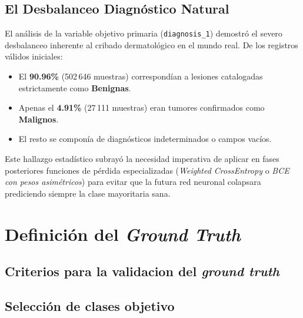 \subsection{El Desbalanceo Diagnóstico Natural}
El análisis de la variable objetivo primaria (\texttt{diagnosis\_1}) demostró el severo desbalanceo inherente al cribado dermatológico en el mundo real. De los registros válidos iniciales:
\begin{itemize}
	\item El \textbf{90.96\%} (502\,646 muestras) correspondían a lesiones catalogadas estrictamente como \textbf{Benignas}.
	\item Apenas el \textbf{4.91\%} (27\,111 muestras) eran tumores confirmados como \textbf{Malignos}.
	\item El resto se componía de diagnósticos indeterminados o campos vacíos.
\end{itemize}
Este hallazgo estadístico subrayó la necesidad imperativa de aplicar en fases posteriores funciones de pérdida especializadas (\textit{Weighted CrossEntropy} o \textit{BCE con pesos asimétricos}) para evitar que la futura red neuronal colapsara prediciendo siempre la clase mayoritaria sana.

\section{Definición del \textit{Ground Truth}}
\subsection{Criterios para la validacion del \textit{ground truth}}
\subsection{Selección de clases objetivo}
